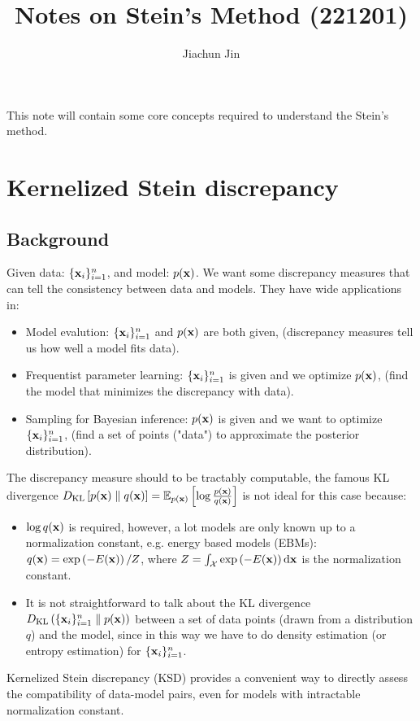 \documentclass{article}
\title{\textbf{\Large Notes on Stein's Method (221201)}}
\author{Jiachun Jin}
\affil{\textit{\small School of Information Science and Technology}}
\affil{\textit{\small ShanghaiTech University}}
\date{}
\begin{document}
\maketitle
This note will contain some core concepts required to understand the Stein's method.
\tableofcontents

\section{Kernelized Stein discrepancy}
\subsection{Background \citep{liu2016short}}
Given data: $\{{\mathbf{x}}_i\}_{i=1}^n$, and model: $p({\mathbf{x}})$. We want some discrepancy measures that can tell the consistency between data and models. They have wide applications in:
\begin{itemize}
    \item Model evalution: $\{{\mathbf{x}}_i\}_{i=1}^n$ and $p({\mathbf{x}})$ are both given, (discrepancy measures tell us how well a model fits data).
    \item Frequentist parameter learning: $\{{\mathbf{x}}_i\}_{i=1}^n$ is given and we optimize $p({\mathbf{x}})$, (find the model that minimizes the discrepancy with data).
    \item Sampling for Bayesian inference: $p({\mathbf{x}})$ is given and we want to optimize $\{{\mathbf{x}}_i\}_{i=1}^n$, (find a set of points ("data") to approximate the posterior distribution).
\end{itemize}
The discrepancy measure should to be tractably computable, the famous KL divergence $D_{\mathrm{KL}}\left[ p({\mathbf{x}}) \parallel q({\mathbf{x}}) \right] = \mathbb{E}_{p({\mathbf{x}})}\left[ \log \frac{p({\mathbf{x}})}{q({\mathbf{x}})} \right]$  is not ideal for this case because:
\begin{itemize}
    \item $\log q({\mathbf{x}})$ is required, however, a lot models are only known up to a normalization constant, e.g. energy based models (EBMs): $q({\mathbf{x}}) = \exp\left(-E({\mathbf{x}})\right) / Z$, where $Z = \int_{\mathcal{X}}\exp\left( -E({\mathbf{x}}) \right)\mathrm{d}{\mathbf{x}}$ is the normalization constant.
    \item It is not straightforward to talk about the KL divergence $D_{\mathrm{KL}}\left( \{{\mathbf{x}}_i\}_{i=1}^n \parallel p({\mathbf{x}}) \right)$ between a set of data points (drawn from a distribution $q$) and the model, since in this way we have to do density estimation (or entropy estimation) for $\{{\mathbf{x}}_i\}_{i=1}^n$.
\end{itemize}
Kernelized Stein discrepancy (KSD) \citep{liu2016kernelized} provides a convenient way to directly assess the compatibility of data-model pairs, even for models with intractable normalization constant.
\end{document}
